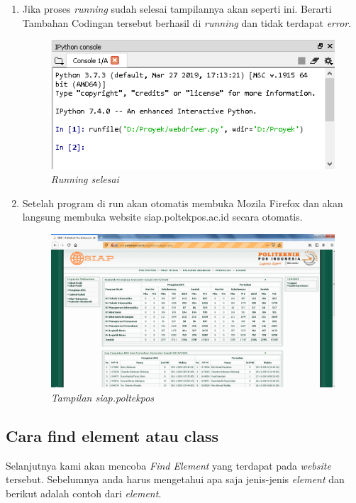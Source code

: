 \begin{enumerate}
\item Jika proses \textit{running} sudah selesai tampilannya akan seperti ini. Berarti Tambahan Codingan tersebut berhasil di \textit{running} dan tidak terdapat \textit{error}.
\begin{figure}[H]
    	\centering
    	\includegraphics[scale=0.5]{figures/run4.png}
    	\caption{\textit{Running selesai}}
    	\label{CLI}
	\end{figure}

\item Setelah program di run akan otomatis membuka Mozila Firefox dan akan langsung membuka website siap.poltekpos.ac.id secara otomatis.
\begin{figure}[H]
    	\centering
    	\includegraphics[scale=0.3]{figures/run5.png}
    	\caption{\textit{Tampilan siap.poltekpos}}
    	\label{CLI}
	\end{figure}


\end{enumerate}

\subsection{Cara find element atau class }
\par Selanjutnya kami akan mencoba \textit{Find Element} yang terdapat pada \textit{website} tersebut. Sebelumnya anda harus mengetahui apa saja jenis-jenis \textit{element} dan berikut adalah contoh dari \textit{element}.

